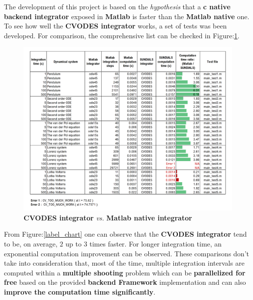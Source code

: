 \documentclass[12pt, letterpaper]{article}
\begin{document}
 The development of this project is based on the \textit{hypothesis} that a \textbf{c native backend integrator} exposed in \textbf{Matlab} is faster than the \textbf{Matlab native} one. To see how well the \textbf{CVODES integrator} works, a set of tests was been developed. For comparison, the comprehensive list can be checked in Figure:\ref{label_table}.

\begin{figure}[h!]
    \centering
    \includegraphics[scale=0.70]{images/table.png}
    \caption{\textbf{CVODES integrator} \textit{vs.} \textbf{Matlab native integrator}}
    \label{label_table}
\end{figure}

From Figure:\ref{label_chart} one can observe that the \textbf{CVODES integrator} tend to be, on average, $2$ up to $3$ times faster. For longer integration time, an exponential computation improvement can be observed. These comparisons don't take into consideration that, most of the time, multiple integration intervals are computed within a \textbf{multiple shooting} problem which can be \textbf{parallelized for free} based on the provided \textbf{ backend Framework} implementation and can also  \textbf{improve the computation time significantly}.
\end{document}
